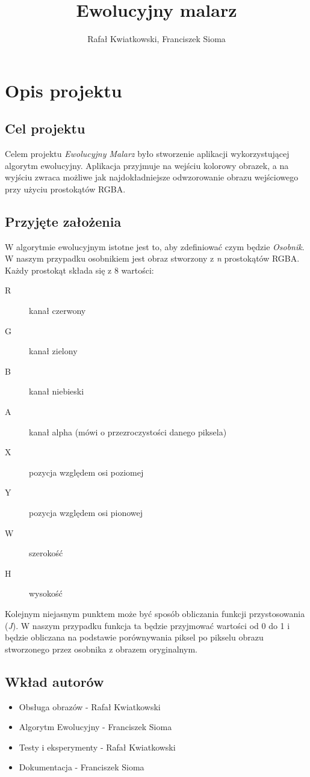 \documentclass{article}
\title{Ewolucyjny malarz }
\author{Rafał Kwiatkowski, Franciszek Sioma}
\begin{document}
\maketitle

\section{Opis projektu}
\subsection{Cel projektu}
Celem projektu {\it Ewolucyjny Malarz} było stworzenie aplikacji wykorzystującej algorytm ewolucyjny. Aplikacja przyjmuje na wejściu kolorowy obrazek, a na wyjściu zwraca możliwe jak najdokładniejsze odwzorowanie obrazu wejściowego przy użyciu prostokątów RGBA. 

\subsection{Przyjęte założenia}
W algorytmie ewolucyjnym istotne jest to, aby zdefiniować czym będzie {\it Osobnik}. W naszym przypadku osobnikiem jest obraz stworzony z {\it n} prostokątów RGBA. Każdy prostokąt składa się z 8 wartości: 
\begin{description}
    \item[R] kanał czerwony
    \item[G] kanał zielony
    \item[B] kanał niebieski
    \item[A] kanał alpha (mówi o przezroczystości danego piksela)
    \item[X] pozycja względem osi poziomej
    \item[Y] pozycja względem osi pionowej
    \item[W] szerokość
    \item[H] wysokość       
\end{description}

Kolejnym niejasnym punktem może być sposób obliczania funkcji przystosowania ({\it J}). W naszym przypadku funkcja ta będzie przyjmować wartości od 0 do 1 i będzie obliczana na podstawie porównywania piksel po pikselu obrazu stworzonego przez osobnika z obrazem oryginalnym.
\subsection{Wkład autorów}
\begin{itemize}
    \item Obsługa obrazów - Rafał Kwiatkowski
    \item Algorytm Ewolucyjny - Franciszek Sioma
    \item Testy i eksperymenty - Rafał Kwiatkowski
    \item Dokumentacja - Franciszek Sioma
\end{itemize}
\end{document}
